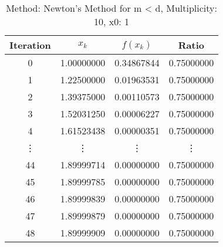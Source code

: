 \begin{table}
\centering
\caption{Method: Newton's Method for m < d, Multiplicity: 10, x0: 1}
\label{tab:table_Newton's_Method_for_m_<_d_10_1}
\begin{tabular}{c c c c}
\toprule
Iteration &      $x_k$ &   $f(x_k)$ &      Ratio \\
\midrule
        0 & 1.00000000 & 0.34867844 & 0.75000000 \\
        1 & 1.22500000 & 0.01963531 & 0.75000000 \\
        2 & 1.39375000 & 0.00110573 & 0.75000000 \\
        3 & 1.52031250 & 0.00006227 & 0.75000000 \\
        4 & 1.61523438 & 0.00000351 & 0.75000000 \\
   \vdots &     \vdots &     \vdots &     \vdots \\
       44 & 1.89999714 & 0.00000000 & 0.75000000 \\
       45 & 1.89999785 & 0.00000000 & 0.75000000 \\
       46 & 1.89999839 & 0.00000000 & 0.75000000 \\
       47 & 1.89999879 & 0.00000000 & 0.75000000 \\
       48 & 1.89999909 & 0.00000000 & 0.75000000 \\
\bottomrule
\end{tabular}
\end{table}

